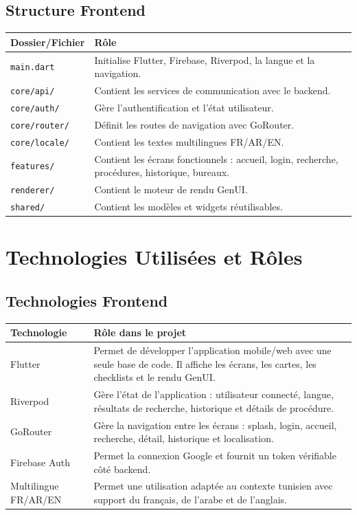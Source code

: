 \documentclass[12pt,a4paper]{report}
\begin{document}
\section{Structure Frontend}

\begin{longtable}{|p{4cm}|p{10cm}|}
\hline
\textbf{Dossier/Fichier} & \textbf{Rôle} \\
\hline
\endhead
\texttt{main.dart} & Initialise Flutter, Firebase, Riverpod, la langue et la navigation. \\
\hline
\texttt{core/api/} & Contient les services de communication avec le backend. \\
\hline
\texttt{core/auth/} & Gère l'authentification et l'état utilisateur. \\
\hline
\texttt{core/router/} & Définit les routes de navigation avec GoRouter. \\
\hline
\texttt{core/locale/} & Contient les textes multilingues FR/AR/EN. \\
\hline
\texttt{features/} & Contient les écrans fonctionnels : accueil, login, recherche, procédures, historique, bureaux. \\
\hline
\texttt{renderer/} & Contient le moteur de rendu GenUI. \\
\hline
\texttt{shared/} & Contient les modèles et widgets réutilisables. \\
\hline
\end{longtable}


\chapter{Technologies Utilisées et Rôles}

\section{Technologies Frontend}

\begin{longtable}{|p{4cm}|p{10cm}|}
\hline
\textbf{Technologie} & \textbf{Rôle dans le projet} \\
\hline
\endhead
Flutter & Permet de développer l'application mobile/web avec une seule base de code. Il affiche les écrans, les cartes, les checklists et le rendu GenUI. \\
\hline
Riverpod & Gère l'état de l'application : utilisateur connecté, langue, résultats de recherche, historique et détails de procédure. \\
\hline
GoRouter & Gère la navigation entre les écrans : splash, login, accueil, recherche, détail, historique et localisation. \\
\hline
Firebase Auth & Permet la connexion Google et fournit un token vérifiable côté backend. \\
\hline
Multilingue FR/AR/EN & Permet une utilisation adaptée au contexte tunisien avec support du français, de l'arabe et de l'anglais. \\
\hline
\end{longtable}
\end{document}
